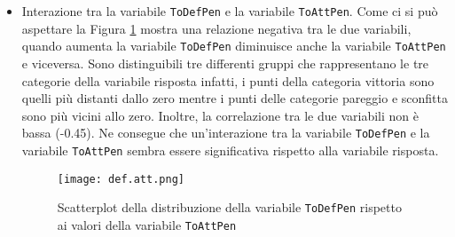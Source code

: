 \begin{itemize}
\begin{figure}[htbp]
\begin{center}
		\end{center}
	\end{figure}
	\item Interazione tra la variabile \texttt{ToDefPen} e la variabile \texttt{ToAttPen}. Come ci si può aspettare la Figura \ref{fig:defatt} mostra una relazione negativa tra le due variabili, quando aumenta la variabile \texttt{ToDefPen} diminuisce anche la variabile \texttt{ToAttPen} e viceversa. Sono distinguibili tre differenti gruppi che rappresentano le tre categorie della variabile risposta infatti, i punti della categoria vittoria sono quelli più distanti dallo zero mentre i punti delle categorie pareggio e sconfitta sono più vicini allo zero. Inoltre, la correlazione tra le due variabili non è bassa (-0.45). Ne consegue che un'interazione tra la variabile \texttt{ToDefPen} e la variabile \texttt{ToAttPen} sembra essere significativa rispetto alla variabile risposta.
	\begin{figure}[htbp]
		\begin{center}
			\texttt{[image: def.att.png]}
			\caption{Scatterplot della distribuzione della variabile \texttt{ToDefPen} rispetto ai valori della variabile \texttt{ToAttPen}}  \label{fig:defatt}
		\end{center}
	\end{figure}
	
\end{itemize}


